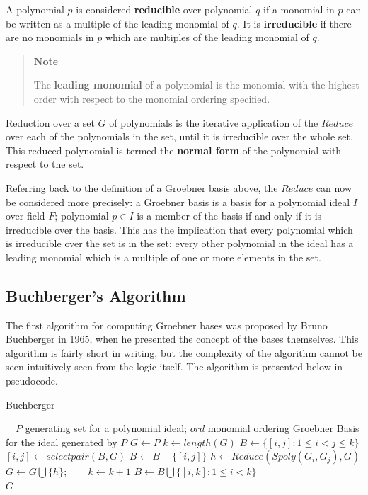 \documentclass[letterpaper,12pt,titlepage,oneside,final]{book}
\newcounter{notecounter}
\newenvironment{note}{\begin{quote}%
    \refstepcounter{notecounter}%
  \textbf{Note \arabic{notecounter}}%
  \quad
}{%
\end{quote}%
}
\begin{document}
A polynomial ${p}$ is considered \textbf{reducible} over polynomial ${q}$ if a monomial in ${p}$ can be written as a multiple of the leading monomial of ${q}$.  It is \textbf{irreducible} if there are no monomials in ${p}$ which are multiples of the leading monomial of ${q}$.    

\begin{note}
  The \textbf{leading monomial} of a polynomial is the monomial with the highest order with respect to the monomial ordering specified.
\end{note}   

Reduction over a set ${G}$ of polynomials is the iterative application of the ${Reduce}$ over each of the polynomials in the set, until it is irreducible over the whole set.  This reduced polynomial is termed the \textbf{normal form} of the polynomial with respect to the set.

Referring back to the definition of a Groebner basis above, the ${Reduce}$ can now be considered more precisely: a Groebner basis is a basis for a polynomial ideal ${I}$ over field ${F}$; polynomial ${p \in I}$ is a member of the basis if and only if it is irreducible over the basis.  This has the implication that every polynomial which is irreducible over the set is in the set; every other polynomial in the ideal has a leading monomial which is a multiple of one or more elements in the set.

\subsection{Buchberger's Algorithm}

The first algorithm for computing Groebner bases was proposed by Bruno Buchberger in 1965, when he presented the concept of the bases themselves.  This algorithm is fairly short in writing, but the complexity of the algorithm cannot be seen intuitively seen from the logic itself.  The algorithm is presented below in pseudocode.

\begin{algorithm}[H]
\caption{Buchberger}\label{buchberger}
\begin{algorithmic}[1]
\Input $\quad P$ generating set for a polynomial ideal; $ord$ monomial ordering
\Output Groebner Basis for the ideal generated by $P$
\State $G \gets P$
\State $k \gets length( G)$
\State $B \gets \{[i, j] : 1 \leq i < j \leq k\}$\\
  \State $[i, j] \gets selectpair( B, G)$
  \State $B \gets B - \{[i, j]\}$
  \State $h \gets Reduce( Spoly( G_i, G_j), G)$
    \State $G \gets G \bigcup \{h\}; \qquad k \gets k + 1$
    \State $B \gets B \bigcup \{[i, k] : 1 \leq i < k\}$
  \EndIf
\EndWhile\\
\Return $G$
\EndProcedure
\end{algorithmic}
\end{algorithm}  
\end{document}

